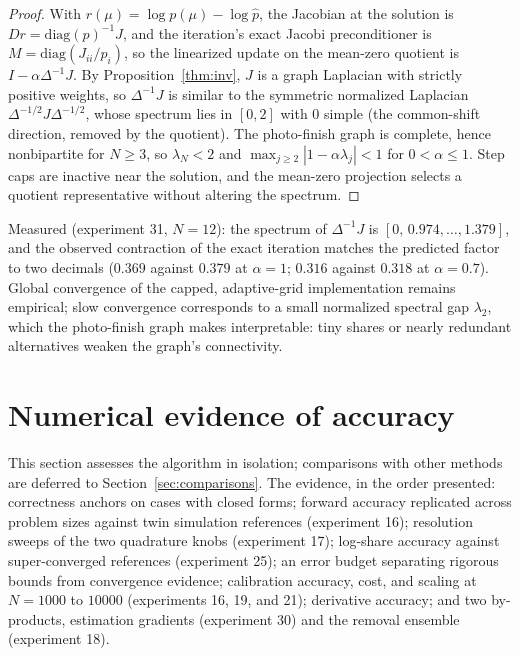 \documentclass[12pt]{article}
\theoremstyle{remark}
\begin{document}
\begin{proof}
With $r(\mu) = \log p(\mu) - \log \hat p$, the Jacobian at the
solution is $Dr = \mathrm{diag}(p)^{-1} J$, and the iteration's exact
Jacobi preconditioner is $M = \mathrm{diag}(J_{ii}/p_i)$, so the
linearized update on the mean-zero quotient is $I - \alpha
\Delta^{-1} J$. By Proposition~\ref{thm:inv}, $J$ is a graph Laplacian
with strictly positive weights, so $\Delta^{-1} J$ is similar to the
symmetric normalized Laplacian $\Delta^{-1/2} J \Delta^{-1/2}$, whose
spectrum lies in $[0, 2]$ with $0$ simple (the common-shift direction,
removed by the quotient). The photo-finish graph is complete, hence
nonbipartite for $N \ge 3$, so $\lambda_N < 2$ and $\max_{j\ge2} |1 -
\alpha \lambda_j| < 1$ for $0 < \alpha \le 1$. Step caps are inactive
near the solution, and the mean-zero projection selects a quotient
representative without altering the spectrum.
\end{proof}

Measured (experiment 31, $N = 12$): the spectrum of $\Delta^{-1}J$ is
$[0,\, 0.974, \dots, 1.379]$, and the observed contraction of the
exact iteration matches the predicted factor to two decimals ($0.369$
against $0.379$ at $\alpha = 1$; $0.316$ against $0.318$ at $\alpha =
0.7$). Global convergence of the capped, adaptive-grid implementation
remains empirical; slow convergence corresponds to a small normalized
spectral gap $\lambda_2$, which the photo-finish graph makes
interpretable: tiny shares or nearly redundant alternatives weaken the
graph's connectivity.

\section{Numerical evidence of accuracy}\label{sec:benchmark}

This section assesses the algorithm in isolation; comparisons with
other methods are deferred to Section~\ref{sec:comparisons}. The
evidence, in the order presented: correctness anchors on cases with
closed forms; forward accuracy replicated across problem sizes against
twin simulation references (experiment 16); resolution sweeps of the two
quadrature knobs (experiment 17); log-share accuracy against
super-converged references (experiment 25); an error budget separating
rigorous bounds from convergence evidence; calibration accuracy, cost,
and scaling at $N = 1000$ to $10000$ (experiments 16, 19, and 21);
derivative accuracy; and two by-products, estimation gradients
(experiment 30) and the removal ensemble (experiment 18).
\end{document}
